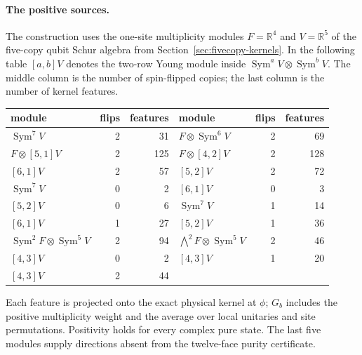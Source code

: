 \paragraph{The positive sources.}
The construction uses the one-site multiplicity modules
$F=\mathbb R^4$ and $V=\mathbb R^5$ of the five-copy qubit Schur algebra
from Section~\ref{sec:fivecopy-kernels}. In the following table
$[a,b]V$ denotes the two-row Young module inside
$\operatorname{Sym}^aV\otimes\operatorname{Sym}^bV$.
The middle column is the number of spin-flipped copies; the last column
is the number of kernel features.
\begin{center}\small
\begin{tabular}{lrr@{\qquad}lrr}
\toprule
module & flips & features & module & flips & features\\
\midrule
$\operatorname{Sym}^7V$ &2&31&
$F\otimes\operatorname{Sym}^6V$ &2&69\\
$F\otimes[5,1]V$ &2&125&$F\otimes[4,2]V$ &2&128\\
$[6,1]V$ &2&57&$[5,2]V$ &2&72\\
$\operatorname{Sym}^7V$ &0&2&$[6,1]V$ &0&3\\
$[5,2]V$ &0&6&$\operatorname{Sym}^7V$ &1&14\\
$[6,1]V$ &1&27&$[5,2]V$ &1&36\\
$\operatorname{Sym}^2F\otimes\operatorname{Sym}^5V$ &2&94&
$\bigwedge^2F\otimes\operatorname{Sym}^5V$ &2&46\\
$[4,3]V$ &0&2&$[4,3]V$ &1&20\\
$[4,3]V$ &2&44&&&\\
\bottomrule
\end{tabular}
\end{center}
Each feature is projected onto the exact physical kernel at $\phi$;
$G_b$ includes the positive multiplicity weight and the average over
local unitaries and site permutations. Positivity holds for every
complex pure state. The last five modules supply directions absent
from the twelve-face purity certificate.

